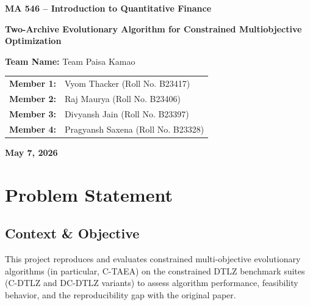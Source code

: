 \documentclass[12pt]{article}
\title{}
\date{}
\begin{document}
\begin{titlepage}
    \centering
    \vspace*{1cm}
    
    \textbf{\Large MA 546 -- Introduction to Quantitative Finance}
    
    \vspace{1.5cm}
    
    {\Huge \textbf{Two-Archive Evolutionary Algorithm for
Constrained Multiobjective Optimization}} \\
    
    \vspace{2cm}
    
    \large
    \textbf{Team Name:} Team Paisa Kamao
    
    \vspace{0.5cm}
        
    \begin{tabular}{ll}
        \textbf{Member 1:} & Vyom Thacker (Roll No. B23417) \\
        \textbf{Member 2:} & Raj Maurya (Roll No. B23406) \\
        \textbf{Member 3:} & Divyansh Jain (Roll No. B23397) \\
        \textbf{Member 4:} & Pragyansh Saxena (Roll No. B23328) \\
    \end{tabular}
    
    \vspace{1.5cm}
    
    \textbf{May 7, 2026}
    
    \vfill
    
\end{titlepage}

\newpage
\tableofcontents
\listoftables
\newpage
\listoffigures
\newpage


\section{Problem Statement}

\subsection*{Context \& Objective}
This project reproduces and evaluates constrained multi-objective evolutionary algorithms (in particular, C-TAEA) on the constrained DTLZ benchmark suites (C-DTLZ and DC-DTLZ variants) to assess algorithm performance, feasibility behavior, and the reproducibility gap with the original paper.
\end{document}
